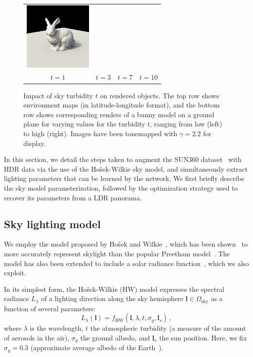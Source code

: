 \begin{figure}
\begin{tabular}{cccc}
\includegraphics[width=.24\linewidth]{figures/hwmodel/t_10.png} \\
$t = 1$ & $t = 3$ & $t = 7$ & $t = 10$ 
\end{tabular}
\caption[Impact of sky turbidity $t$ on rendered objects]{Impact of sky turbidity $t$ on rendered objects. The top row shows environment maps (in latitude-longitude format), and the bottom row shows corresponding renders of a bunny model on a ground plane for varying values for the turbidity $t$, ranging from low (left) to high (right). Images have been tonemapped with $\gamma = 2.2$ for display.}
\label{fig:turbidity-comparison}
\end{figure}

In this section, we detail the steps taken to augment the SUN360 dataset~\cite{xiao-cvpr-12} with HDR data via the use of the Ho\v{s}ek-Wilkie sky model, and simultaneously extract lighting parameters that can be learned by the network. We first briefly describe the sky model parameterization, followed by the optimization strategy used to recover its parameters from a LDR panorama. 

\subsection{Sky lighting model}

We employ the model proposed by Ho\v{s}ek and Wilkie~\cite{hosek-siggraph-12}, which has been shown~\cite{kider-tog-14} to more accurately represent skylight than the popular Preetham model~\cite{preetham-siggraph-99}. The model has also been extended to include a solar radiance function~\cite{hosek-cga-13}, which we also exploit.

In its simplest form, the Ho\v{s}ek-Wilkie (HW) model expresses the spectral radiance $L_\lambda$ of a lighting direction along the sky hemisphere $\mathbf{l} \in \Omega_\text{sky}$ as a function of several parameters:
%
\begin{equation}
L_\lambda(\mathbf{l}) = f_\text{HW}(\mathbf{l}, \lambda, t, \sigma_g, \mathbf{l}_s) \,,
\end{equation}
%
where $\lambda$ is the wavelength, $t$ the atmospheric turbidity (a measure of the amount of aerosols in the air), $\sigma_g$ the ground albedo, and $\mathbf{l}_s$ the sun position. Here, we fix $\sigma_g = 0.3$ (approximate average albedo of the Earth~\cite{goode-grl-01}). 

